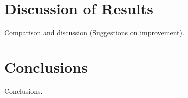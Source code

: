 \section{Discussion of Results}
Comparison and discussion (Suggestions on improvement).


\section{Conclusions}
Conclusions.
